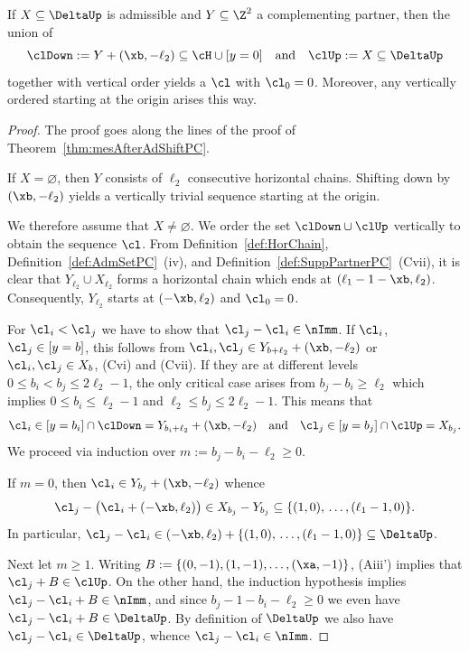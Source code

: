 \begin{theorem}
\label{thm:mesAfterAdShift}
If $X\subseteq \DeltaUp$ is 
admissible and $Y\subseteq \Z^2$ a 
complementing partner, then the union of
$$
\clDown:=Y+(\xb,-\ell_2)\subseteq\cH\cup[y=0] 
\quad\mbox{and}\quad 
\clUp:=X\subseteq\DeltaUp
$$
together with vertical order yields a 
{\mes} $\cl$ with $\cl_0=0$. {Moreover, any
vertically ordered {\mes} starting at the origin 
arises this way.}
\end{theorem}

\begin{proof}
The proof goes along the lines of the
proof of Theorem~\ref{thm:mesAfterAdShiftPC}.

If $X=\varnothing$, then $Y$ consists of 
$\ell_2$ consecutive horizontal chains.
Shifting down by $(\xb,-\ell_2)$ yields 
a vertically trivial sequence starting 
at the origin. 

We therefore assume that $X\not=\varnothing$.
We order the set $\clDown\cup\clUp$ 
vertically to obtain the sequence $\cl$. 
From Definition~\ref{def:HorChain},
Definition~\ref{def:AdmSetPC}~(iv), and
Definition~\ref{def:SuppPartnerPC}~(Cvii), 
it is clear that $Y_{\ell_2}\cup X_{\ell_2}$ 
forms a horizontal chain which ends at 
$(\ell_1-1-\xb,\ell_2)$. Consequently, 
$Y_{\ell_2}$ starts at $(-\xb,\ell_2)$ 
and $\cl_0=0$.

For $\cl_i<\cl_j$ we have to show that 
$\cl_j-\cl_i\in\nImm$. 
If $\cl_i$, 
$\cl_j\in[y=b]$, this follows from
$\cl_i,\cl_j\in Y_{b+\ell_2}+(\xb,-\ell_2)$
or $\cl_i,\cl_j\in X_b$, (Cvi) 
and (Cvii). If they are at different levels 
$0\leq b_i<b_j\leq 2\ell_2-1$, the only
critical case arises from $b_j-b_i\geq \ell_2$
which implies $0\leq b_i\leq\ell_2-1$ and 
$\ell_2\leq b_j\leq2\ell_2-1$. This means that
$$
\cl_i\in[y=b_i]\cap\clDown=Y_{b_i+\ell_2}+(\xb,-\ell_2)
\quad\mbox{and}\quad\cl_j\in[y=b_j]\cap\clUp=X_{b_j}.
$$
We proceed via induction over $m:=b_j-b_i-
\ell_2\geq 0$. 

If $m=0$, then $\cl_i\in Y_{b_j}+(\xb,-\ell_2)$ 
whence
$$
\cl_j-\big(\cl_i+(-\xb,\ell_2)\big)\in X_{b_j}-Y_{b_j}\subseteq
\{(1,0),\,\ldots, (\ell_1-1,0)\}.
$$
In particular,  
$\cl_j-\cl_i\in (-\xb,\ell_2)+\{(1,0),\,\ldots,
(\ell_1-1,0)\}\subseteq\DeltaUp$.

Next let $m\geq 1$. Writing 
$B:=\{(0,-1),(1,-1),\ldots,(\xa,-1)\}$,
(Aiii') implies that
$\cl_j+B\in\clUp$. On the other hand,
the induction hypothesis implies $\cl_j-\cl_i+B
\in\nImm$, and since $b_j-1-b_i-\ell_2\geq0$
we even have $\cl_j-\cl_i+B\in\DeltaUp$.
By definition of $\DeltaUp$ we also have
$\cl_j-\cl_i\in\DeltaUp$, whence $\cl_j-\cl_i
\in\nImm$.


\end{proof}
